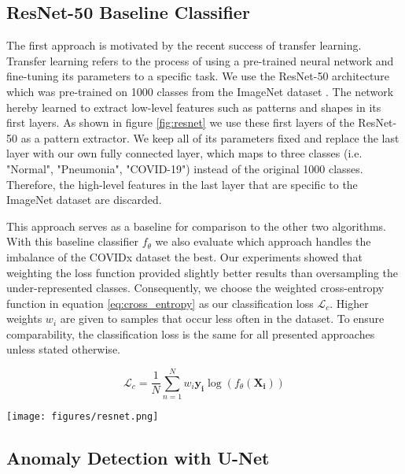 \documentclass[conference]{IEEEtran}
\begin{document}
\subsection{ResNet-50 Baseline Classifier\label{resnet_baseline}}

The first approach is motivated by the recent success of transfer learning. Transfer learning refers to the process of using a pre-trained neural network and fine-tuning its parameters to a specific task. We use the ResNet-50 architecture \cite{he2015deep} which was pre-trained on 1000 classes from the ImageNet dataset \cite{deng2009imagenet}. The network hereby learned to extract low-level features such as patterns and shapes in its first layers. As shown in figure \ref{fig:resnet} we use these first layers of the ResNet-50 as a pattern extractor. We keep all of its parameters fixed and replace the last layer with our own fully connected layer, which maps to three classes (i.e. "Normal", "Pneumonia", "COVID-19") instead of the original 1000 classes. Therefore, the high-level features in the last layer that are specific to the ImageNet dataset are discarded.

This approach serves as a baseline for comparison to the other two algorithms. With this baseline classifier $f_\theta$ we also evaluate which approach handles the imbalance of the COVIDx dataset the best. Our experiments showed that weighting the loss function provided slightly better results than oversampling the under-represented classes. Consequently, we choose the weighted cross-entropy function in equation \ref{eq:cross_entropy} as our classification loss $\mathcal{L}_{c}$. Higher weights $w_i$ are given to samples that occur less often in the dataset. To ensure comparability, the classification loss is the same for all presented approaches unless stated otherwise.

\begin{equation}
	\mathcal{L}_{c} = \frac{1}{N} \sum_{n=1}^{N}w_i \mathbf{y_i} \log(f_\theta(\mathbf{X_i}))
	\label{eq:cross_entropy}
\end{equation}

\begin{figure*}
	\centering
	\texttt{[image: figures/resnet.png]}
	\caption{Architecture of ResNet-50 Baseline Classifier}
	\label{fig:resnet}
\end{figure*}

\subsection{Anomaly Detection with U-Net}
\end{document}
